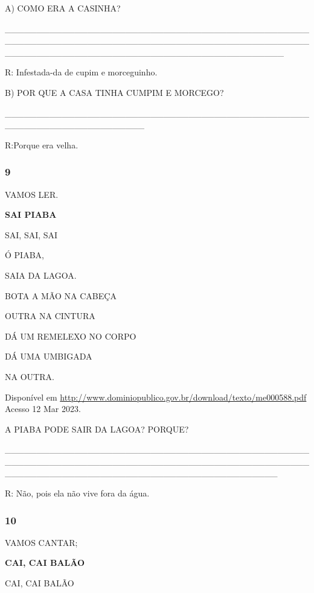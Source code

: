 A) COMO ERA A CASINHA?

\_\_\_\_\_\_\_\_\_\_\_\_\_\_\_\_\_\_\_\_\_\_\_\_\_\_\_\_\_\_\_\_\_\_\_\_\_\_\_\_\_\_\_\_\_\_\_\_\_\_\_\_\_\_\_\_\_\_\_\_\_\_\_\_\_\_\_\_\_\_\_\_\_\_\_\_\_\_\_\_\_\_\_\_\_\_\_\_\_\_\_\_\_\_\_\_\_\_\_\_\_\_\_\_\_\_\_\_\_\_\_\_\_\_\_\_\_\_\_\_\_\_\_\_\_\_\_\_\_\_\_\_\_\_\_\_\_\_\_\_

R: Infestada-da de cupim e morceguinho.

B) POR QUE A CASA TINHA CUMPIM E MORCEGO?

\_\_\_\_\_\_\_\_\_\_\_\_\_\_\_\_\_\_\_\_\_\_\_\_\_\_\_\_\_\_\_\_\_\_\_\_\_\_\_\_\_\_\_\_\_\_\_\_\_\_\_\_\_\_\_\_\_\_\_\_\_\_\_\_\_\_\_\_\_\_

R:Porque era velha.

\subsubsection{9 }\label{section-76}

VAMOS LER.

\textbf{SAI PIABA}

SAI, SAI, SAI

Ó PIABA,

SAIA DA LAGOA.

BOTA A MÃO NA CABEÇA

OUTRA NA CINTURA

DÁ UM REMELEXO NO CORPO

DÁ UMA UMBIGADA

NA OUTRA.

Disponível em
\url{http://www.dominiopublico.gov.br/download/texto/me000588.pdf}
Acesso 12 Mar 2023.

A PIABA PODE SAIR DA LAGOA? PORQUE?

\_\_\_\_\_\_\_\_\_\_\_\_\_\_\_\_\_\_\_\_\_\_\_\_\_\_\_\_\_\_\_\_\_\_\_\_\_\_\_\_\_\_\_\_\_\_\_\_\_\_\_\_\_\_\_\_\_\_\_\_\_\_\_\_\_\_\_\_\_\_\_\_\_\_\_\_\_\_\_\_\_\_\_\_\_\_\_\_\_\_\_\_\_\_\_\_\_\_\_\_\_\_\_\_\_\_\_\_\_\_\_\_\_\_\_\_\_\_\_\_\_\_\_\_\_\_\_\_\_\_\_\_\_\_\_\_\_\_\_

R: Não, pois ela não vive fora da água.

\subsubsection{10}\label{section-77}

VAMOS CANTAR;

\textbf{CAI, CAI BALÃO}

CAI, CAI BALÃO

